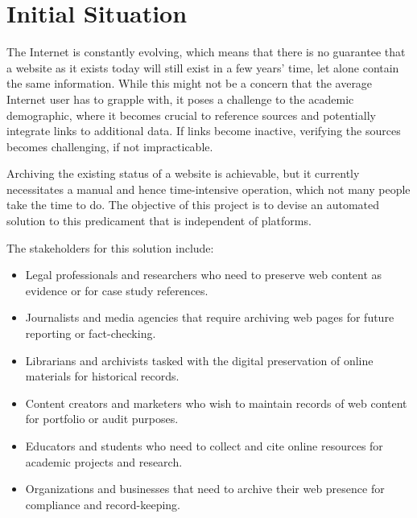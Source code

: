 \section{Initial Situation}
The Internet is constantly evolving, which means that there is no guarantee that a website as it exists today will still exist in a few years' time, let alone contain the same information. While this might not be a concern that the average Internet user has to grapple with, it poses a challenge to the academic demographic, where it becomes crucial to reference sources and potentially integrate links to additional data. If links become inactive, verifying the sources becomes challenging, if not impracticable.

Archiving the existing status of a website is achievable, but it currently necessitates a manual and hence time-intensive operation, which not many people take the time to do. The objective of this project is to devise an automated solution to this predicament that is independent of platforms.

The stakeholders for this solution include:
\begin{itemize}
	\item Legal professionals and researchers who need to preserve web content as evidence or for case study references.
	\item Journalists and media agencies that require archiving web pages for future reporting or fact-checking.
	\item Librarians and archivists tasked with the digital preservation of online materials for historical records.
	\item Content creators and marketers who wish to maintain records of web content for portfolio or audit purposes.
	\item Educators and students who need to collect and cite online resources for academic projects and research.
	\item Organizations and businesses that need to archive their web presence for compliance and record-keeping.
\end{itemize}
\clearpage

